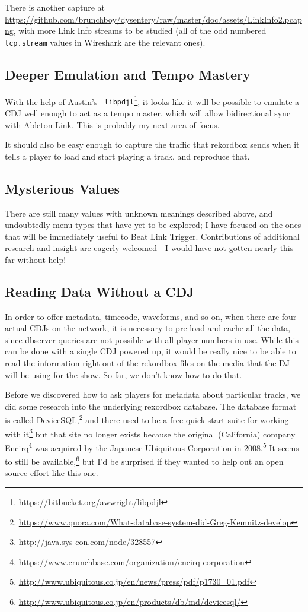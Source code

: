 \documentclass[11pt]{article}
\begin{document}
There is another capture at
\url{https://github.com/brunchboy/dysentery/raw/master/doc/assets/LinkInfo2.pcapng},
with more Link Info streams to be studied (all of the odd numbered
{\tt tcp.stream} values in Wireshark are the relevant ones).

\subsection{Deeper Emulation and Tempo Mastery}

With the help of Austin's {\tt
 libpdjl}\footnote{\url{https://bitbucket.org/awwright/libpdjl}}, it
looks like it will be possible to emulate a CDJ well enough to act as
a tempo master, which will allow bidirectional sync with Ableton Link.
This is probably my next area of focus.

It should also be easy enough to capture the traffic that rekordbox
sends when it tells a player to load and start playing a track, and
reproduce that.

\subsection{Mysterious Values}

There are still many values with unknown meanings described above, and
undoubtedly menu types that have yet to be explored; I have focused on
the ones that will be immediately useful to Beat Link Trigger.
Contributions of additional research and insight are eagerly
welcomed---I would have not gotten nearly this far without help!

\subsection{Reading Data Without a CDJ}

In order to offer metadata, timecode, waveforms, and so on, when there
are four actual CDJs on the network, it is necessary to pre-load and
cache all the data, since dbserver queries are not possible with all
player numbers in use. While this can be done with a single CDJ
powered up, it would be really nice to be able to read the information
right out of the rekordbox files on the media that the DJ will be
using for the show. So far, we don't know how to do that.

Before we discovered how to ask players for metadata about
particular tracks, we did some research into the underlying rexordbox
database. The database format is called
DeviceSQL,\footnote{\url{https://www.quora.com/What-database-system-did-Greg-Kemnitz-develop}}
and there used to be a free quick start suite for working with
it\footnote{\url{http://java.sys-con.com/node/328557}} but that site
no longer exists because the original (California) company
Encirq\footnote{\url{https://www.crunchbase.com/organization/encirq-corporation}}
was acquired by the Japanese Ubiquitous Corporation in
2008.\footnote{\url{http://www.ubiquitous.co.jp/en/news/press/pdf/p1730_01.pdf}}
It seems to still be
available,\footnote{\url{http://www.ubiquitous.co.jp/en/products/db/md/devicesql/}}
but I'd be surprised if they wanted to help out an open source effort
like this one.
\end{document}

